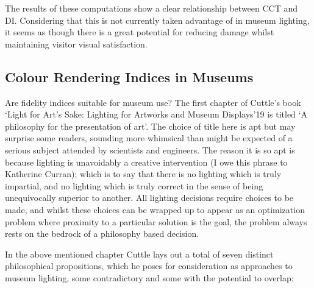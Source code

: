 %

\begin{fullpagefigure}
\caption{The \glspl{CCT} and \glspl{DI} of the \glspl{SPD} used by \citet{houser_review_2013} [provided via personal communication, but now partially available via \gls{PTB} as `spd\_houser'].}
\label{fig:CCTvsDI}
\end{fullpagefigure}

The results of these computations show a clear relationship between \gls{CCT} and \gls{DI}. Considering that this is not currently taken advantage of in museum lighting, it seems as though there is a great potential for reducing damage whilst maintaining visitor visual satisfaction.

\subsection{Colour Rendering Indices in Museums}

Are fidelity indices suitable for museum use? 
The first chapter of Cuttle's book `Light for Art's Sake: Lighting for Artworks and Museum Displays'19 is titled `A philosophy for the presentation of art'. The choice of title here is apt but may surprise some readers, sounding more whimsical than might be expected of a serious subject attended by scientists and engineers. The reason it is so apt is because lighting is unavoidably a creative intervention (I owe this phrase to Katherine Curran); which is to say that there is no lighting which is truly impartial, and no lighting which is truly correct in the sense of being unequivocally superior to another. All lighting decisions require choices to be made, and whilst these choices can be wrapped up to appear as an optimization problem where proximity to a particular solution is the goal, the problem always rests on the bedrock of a philosophy based decision.

In the above mentioned chapter Cuttle lays out a total of seven distinct philosophical propositions, which he poses for consideration as approaches to museum lighting, some contradictory and some with the potential to overlap:

